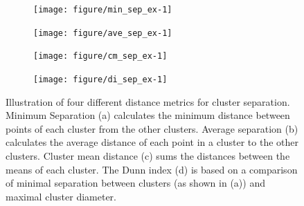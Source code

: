 \documentclass[12pt]{article}\usepackage[]{graphicx}\usepackage[]{color}
\newenvironment{knitrout}{}{} %
\begin{document}
\begin{figure}[!t]

\centering
\begin{subfigure}[t]{0.24\textwidth}
\caption{\label{type1_minsep} }
\begin{knitrout}
\color{fgcolor}
\texttt{[image: figure/min\_sep\_ex-1]} 

\end{knitrout}
\end{subfigure}
\begin{subfigure}[t]{0.24\textwidth}
\caption{\label{type_2_avesep}}
\begin{knitrout}
\color{fgcolor}
\texttt{[image: figure/ave\_sep\_ex-1]} 

\end{knitrout}
\end{subfigure}
\begin{subfigure}[t]{0.24\textwidth}
\caption{\label{type_2_clsep}}
\begin{knitrout}
\color{fgcolor}
\texttt{[image: figure/cm\_sep\_ex-1]} 

\end{knitrout}
\end{subfigure}
\begin{subfigure}[t]{0.24\textwidth}
\caption{\label{type_2_dunn}}
\vfill
\begin{knitrout}
\color{fgcolor}
\texttt{[image: figure/di\_sep\_ex-1]} 

\end{knitrout}
\end{subfigure}

	\vspace{-.1in}
\caption{Illustration of four different distance metrics for cluster separation. Minimum Separation (a) calculates the minimum distance between points of each cluster from the other clusters. Average separation (b) calculates the average distance of each point in a cluster to the other clusters. Cluster mean distance (c) sums the distances between the means of each cluster. The Dunn index (d) is based on a comparison of minimal separation between clusters (as shown in  (a)) and maximal cluster diameter.}
\label{sep-dist}
\end{figure}
\end{document}
